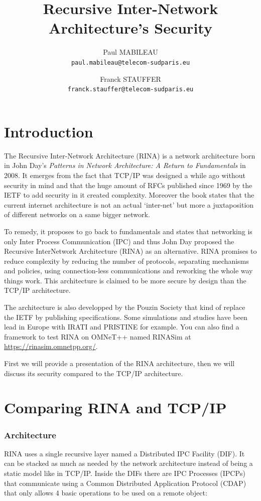 \documentclass[a4paper]{proc}
\author{Paul MABILEAU\\\texttt{paul.mabileau@telecom-sudparis.eu}
        \and Franck STAUFFER\\\texttt{franck.stauffer@telecom-sudparis.eu}}
\title{\textbf{Recursive Inter-Network Architecture's Security}}
\begin{document}
\maketitle
\tableofcontents
\newpage
\part{Introduction}

The Recursive Inter-Network Architecture (RINA) is a network architecture born
in John Day's \textit{Patterns in Network Architecture: A Return to
Fundamentals} in 2008.  It emerges from the fact that TCP/IP was designed a
while ago without security in mind and that the huge amount of RFCs\cite{rfc}
published since 1969 by the IETF to add security in it created
complexity.\cite{assessing-security} Moreover the book states that the current
internet architecture is not an actual `inter-net' but more a juxtaposition of
different networks on a same bigger network.

To remedy, it proposes to go back to fundamentals and states that networking is
only Inter Process Communication (IPC) and thus John Day proposed the Recursive
InterNetwork Architecture (RINA) as an alternative.  RINA promises to reduce
complexity by reducing the number of protocols, separating mechanisms and
policies, using connection-less communications and reworking the whole way
things work.  This architecture is claimed to be more secure by design than the
TCP/IP architecture.

The architecture is also developped by the Pouzin Society\cite{psoc} that kind
of replace the IETF by publishing specifications.  Some simulations and studies
have been lead in Europe with IRATI\cite{web:irati} and PRISTINE\cite{pristine}
for example.  You can also find a framework to test RINA on OMNeT++ named
RINASim at \url{https://rinasim.omnetpp.org/}.

First we will provide a presentation of the RINA architecture, then we will
discuss its security compared to the TCP/IP architecture.

\newpage
\part{Comparing RINA and TCP/IP}
\section{Architecture}

RINA uses a single recursive layer named a Distributed IPC Facility (DIF). It
can be stacked as much as needed by the network architecture instead of being a
static model like in TCP/IP\@.  Inside the DIFs there are IPC Processes (IPCPs)
that communicate using a Common Distributed Application Protocol (CDAP) that
only allows 4 basic operations to be used on a remote object\cite{Trouva2011ISTI}:
\end{document}
